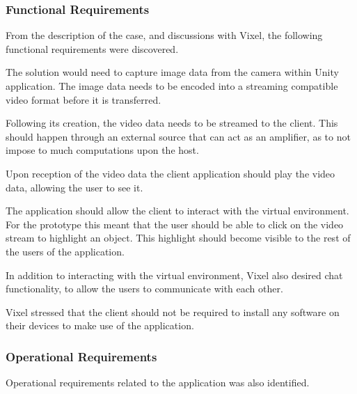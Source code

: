 \subsubsection{Functional Requirements}
From the description of the case, and discussions with Vixel, the following functional requirements were discovered.

The solution would need to capture image data from the camera within Unity application. The image data needs to be encoded into a streaming compatible video format before it is transferred.

Following its creation, the video data needs to be streamed to the client. This should happen through an external source that can act as an amplifier, as to not impose to much computations upon the host.

Upon reception of the video data the client application should play the video data, allowing the user to see it. 

The application should allow the client to interact with the virtual environment. For the prototype this meant that the user should be able to click on the video stream to highlight an object. This highlight should become visible to the rest of the users of the application.

In addition to interacting with the virtual environment, Vixel also desired chat functionality, to allow the users to communicate with each other.

Vixel stressed that the client should not be required to install any software on their devices to make use of the application. 

\subsubsection{Operational Requirements}
Operational requirements related to the application was also identified.

